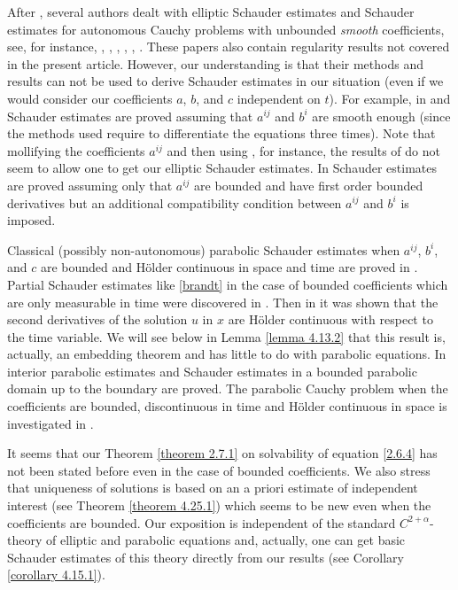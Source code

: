 \documentclass[reqno,12pt]{amsart}
\theoremstyle{definition}
\theoremstyle{remark}
\begin{document}
   After \cite{DL}, several authors  dealt with elliptic Schauder
estimates  and Schauder estimates for autonomous   Cauchy problems
with unbounded {\it smooth\/} coefficients, see, for instance,
\cite{BL},  \cite{Ce0},   \cite{Ce}, \cite{Lu1}, \cite{LV},
\cite{P}.
   These papers also contain regularity results not covered
   in the present article. However,
our understanding is that their methods and results can not be
used to derive Schauder
   estimates in
   our situation (even if we would consider our coefficients
    $a$, $b$, and $c$ independent on $t$).
      For example, in \cite{Lu1} and \cite{Ce}
        Schauder estimates are proved assuming that $a^{ij}$ and $b^i$
          are smooth
           enough (since the methods used require to differentiate
             the
equations three times).  Note that
    mollifying the coefficients $a^{ij}$
   and then using , for instance, the results of \cite{Lu1}
   do  not
   seem to allow one to get  our elliptic Schauder estimates.
   In \cite{LV}   Schauder
   estimates are proved assuming only that  $a^{ij}$ are bounded
   and  have  first order
   bounded derivatives but  an additional  compatibility
     condition
   between  $a^{ij}$ and $b^i$ is imposed.

Classical  (possibly non-autonomous)
   parabolic Schauder
estimates when $a^{ij}$, $b^i$, and $c$ are bounded and H\"older
continuous in space and time are proved in \cite{LSU}. Partial
Schauder estimates like \eqref{brandt} in the case of bounded
coefficients which are only measurable in time were discovered in
\cite{B}. Then in \cite{Kn} it was   shown that the second
derivatives of the solution $u$ in $x$ are H\"older continuous
with respect to the time variable.  We will see below in Lemma
\ref{lemma 4.13.2} that this result is, actually, an embedding
theorem and has little to do with parabolic equations. In \cite{L}
interior parabolic estimates and Schauder estimates in a bounded
parabolic domain up to the boundary are proved.  The parabolic
Cauchy  problem when the coefficients are bounded, discontinuous
    in time and  H\"older continuous in space
is investigated in \cite{Lo}.

   It seems that our Theorem \ref{theorem 2.7.1}
    on solvability of equation \eqref{2.6.4}
    has not
   been stated
   before even in the case of bounded coefficients.
   We also stress
    that  uniqueness  of solutions is based
   on an a priori
   estimate of independent interest
   (see Theorem
\ref{theorem 4.25.1}) which seems to be new even
   when the coefficients are bounded.
    Our  exposition
   is independent
of the standard $C^{2+\alpha}$-theory of elliptic and parabolic
equations and, actually, one can get basic Schauder estimates of
this theory directly  from our results  (see Corollary
\ref{corollary 4.15.1}).
\end{document}
